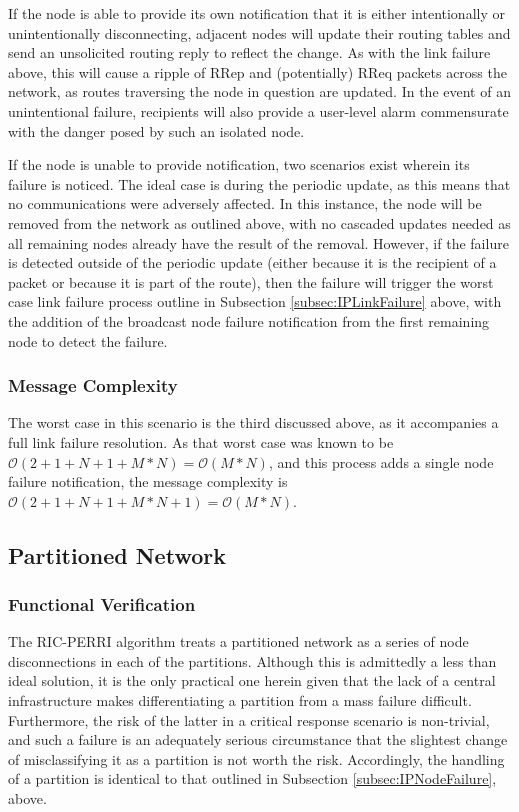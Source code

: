 If the node is able to provide its own notification that it is either intentionally or unintentionally disconnecting, adjacent nodes will update their routing tables and send an unsolicited routing reply to reflect the change. As with the link failure above, this will cause a ripple of RRep and (potentially) RReq packets across the network, as routes traversing the node in question are updated. In the event of an unintentional failure, recipients will also provide a user-level alarm commensurate with the danger posed by such an isolated node.

If the node is unable to provide notification, two scenarios exist wherein its failure is noticed. The ideal case is during the periodic update, as this means that no communications were adversely affected. In this instance, the node will be removed from the network as outlined above, with no cascaded updates needed as all remaining nodes already have the result of the removal. However, if the failure is detected outside of the periodic update (either because it is the recipient of a packet or because it is part of the route), then the failure will trigger the worst case link failure process outline in Subsection \ref{subsec:IPLinkFailure} above, with the addition of the broadcast node failure notification from the first remaining node to detect the failure.
\subsubsection{Message Complexity}
The worst case in this scenario is the third discussed above, as it accompanies a full link failure resolution. As that worst case was known to be $\mathcal{O}(2 + 1 + N + 1 +M*N) = \mathcal{O}(M*N)$, and this process adds a single node failure notification, the message complexity is $\mathcal{O}(2 + 1 + N + 1 +M*N+1) = \mathcal{O}(M*N)$.

\subsection{Partitioned Network}\label{subsec:IPPartitionedNetwork}
\subsubsection{Functional Verification}
The RIC-PERRI algorithm treats a partitioned network as a series of node disconnections in each of the partitions. Although this is admittedly a less than ideal solution, it is the only practical one herein given that the lack of a central infrastructure makes differentiating a partition from a mass failure difficult. Furthermore, the risk of the latter in a critical response scenario is non-trivial, and such a failure is an adequately serious circumstance that the slightest change of misclassifying it as a partition is not worth the risk. Accordingly, the handling of a partition is identical to that outlined in Subsection \ref{subsec:IPNodeFailure}, above.
